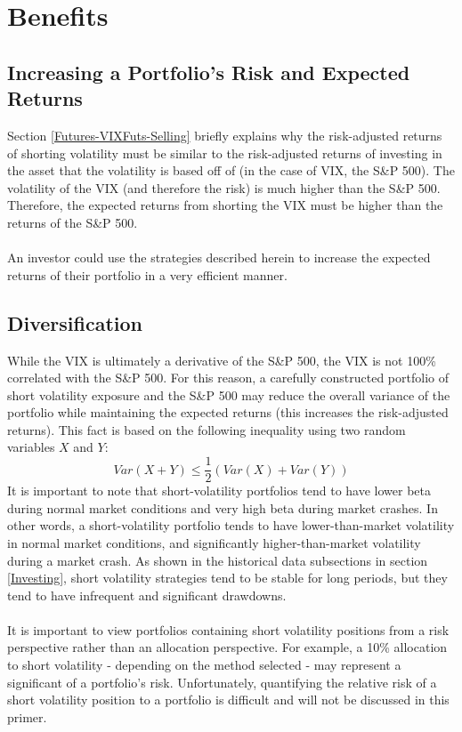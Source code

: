 \documentclass[11pt, oneside]{book}
\begin{document}
\section{Benefits} \label{Conclusion-Benefits}
\subsection{Increasing a Portfolio's Risk and Expected Returns} \label{Conclusion-Benefits-IncreaseEV}
Section \ref{Futures-VIXFuts-Selling} briefly explains why the risk-adjusted returns of shorting volatility must be similar to the risk-adjusted returns of investing in the asset that the volatility is based off of (in the case of VIX, the S\&P 500). The volatility of the VIX (and therefore the risk) is much higher than the S\&P 500. Therefore, the expected returns from shorting the VIX must be higher than the returns of the S\&P 500.\\
\\
An investor could use the strategies described herein to increase the expected returns of their portfolio in a very efficient manner. 

\subsection{Diversification} \label{Conclusion-Benefits-Diversify}
While the VIX is ultimately a derivative of the S\&P 500, the VIX is not 100\% correlated with the S\&P 500. For this reason, a carefully constructed portfolio of short volatility exposure and the S\&P 500 may reduce the overall variance of the portfolio while maintaining the expected returns (this increases the risk-adjusted returns). This fact is based on the following inequality using two random variables $X$ and $Y$:
\begin{equation}
Var(X+Y) \leq \frac{1}{2}(Var(X) + Var(Y))
\end{equation} \label{Eq-VarianceSum}
It is important to note that short-volatility portfolios tend to have lower beta during normal market conditions and very high beta during market crashes. In other words, a short-volatility portfolio tends to have lower-than-market volatility in normal market conditions, and significantly higher-than-market volatility during a market crash. As shown in the historical data subsections in section \ref{Investing}, short volatility strategies tend to be stable for long periods, but they tend to have infrequent and significant drawdowns.  \\
\\
It is important to view portfolios containing short volatility positions from a risk perspective rather than an allocation perspective. For example, a 10\% allocation to short volatility - depending on the method selected - may represent a significant of a portfolio's risk. Unfortunately, quantifying the relative risk of a short volatility position to a portfolio is difficult and will not be discussed in this primer.
\end{document}
